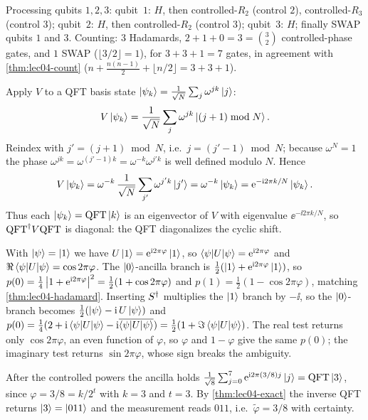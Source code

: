 \begin{solution}
Processing qubits $1,2,3$: qubit~$1$: $H$, then controlled-$R_2$ (control $2$),
controlled-$R_3$ (control $3$); qubit~$2$: $H$, then controlled-$R_2$ (control
$3$); qubit~$3$: $H$; finally SWAP qubits $1$ and $3$. Counting: $3$ Hadamards,
$2+1+0=3=\binom{3}{2}$ controlled-phase gates, and $1$ SWAP
($\lfloor3/2\rfloor=1$), for $3+3+1=7$ gates, in agreement with
\cref{thm:lec04-count} ($n+\tfrac{n(n-1)}2+\lfloor n/2\rfloor=3+3+1$).
\end{solution}

\begin{solution}
Apply $V$ to a QFT basis state $\ket{\psi_k}=\tfrac{1}{\sqrt N}\sum_j\omega^{jk}
\ket{j}$:
\[
  V\ket{\psi_k}=\frac{1}{\sqrt N}\sum_{j}\omega^{jk}\ket{(j+1)\bmod N}.
\]
Reindex with $j'=(j+1)\bmod N$, i.e.\ $j=(j'-1)\bmod N$; because $\omega^{N}=1$
the phase $\omega^{jk}=\omega^{(j'-1)k}=\omega^{-k}\omega^{j'k}$ is well defined
modulo $N$. Hence
\[
  V\ket{\psi_k}=\omega^{-k}\,\frac{1}{\sqrt N}\sum_{j'}\omega^{j'k}\ket{j'}
   =\omega^{-k}\ket{\psi_k}=\mathrm{e}^{-\mathrm{i} 2\pi k/N}\ket{\psi_k}.
\]
Thus each $\ket{\psi_k}=\mathrm{QFT}\ket{k}$ is an eigenvector of $V$ with eigenvalue
$\ee^{-\ii 2\pi k/N}$, so $\mathrm{QFT}^{\dagger} V\mathrm{QFT}$ is diagonal: the QFT diagonalizes the
cyclic shift.
\end{solution}

\begin{solution}
With $\ket{\psi}=\ket{1}$ we have $U\ket{1}=\mathrm{e}^{\mathrm{i} 2\pi\varphi}\ket{1}$, so
$\braket{\psi|U|\psi}=\mathrm{e}^{\mathrm{i} 2\pi\varphi}$ and
$\Re\braket{\psi|U|\psi}=\cos2\pi\varphi$. The $\ket{0}$-ancilla branch is
$\tfrac12(\ket{1}+\mathrm{e}^{\mathrm{i} 2\pi\varphi}\ket{1})$, so
$p(0)=\tfrac14\left\lvert 1+\mathrm{e}^{\mathrm{i} 2\pi\varphi} \right\rvert^{2}=\tfrac12(1+\cos2\pi\varphi)$ and
$p(1)=\tfrac12(1-\cos2\pi\varphi)$, matching \cref{thm:lec04-hadamard}. Inserting
$S^{\dagger}$ multiplies the $\ket{1}$ branch by $-\ii$, so the $\ket{0}$-branch becomes
$\tfrac12(\ket{\psi}-\mathrm{i}\,U\ket{\psi})$ and $p(0)=\tfrac14(2+\mathrm{i}\braket{\psi|U|
\psi}-\mathrm{i}\overline{\braket{\psi|U|\psi}})=\tfrac12(1+\Im\braket{\psi|U|\psi})$.
The real test returns only $\cos2\pi\varphi$, an even function of $\varphi$, so
$\varphi$ and $1-\varphi$ give the same $p(0)$; the imaginary test returns
$\sin2\pi\varphi$, whose sign breaks the ambiguity.
\end{solution}

\begin{solution}
After the controlled powers the ancilla holds
$\tfrac{1}{\sqrt8}\sum_{j=0}^{7}\mathrm{e}^{\mathrm{i} 2\pi(3/8)j}\ket{j}=\mathrm{QFT}\ket{3}$, since
$\varphi=3/8=k/2^{t}$ with $k=3$ and $t=3$. By \cref{thm:lec04-exact} the inverse
QFT returns $\ket{3}=\ket{011}$ and the measurement reads $011$, i.e.\
$\tilde\varphi=3/8$ with certainty.
\end{solution}

